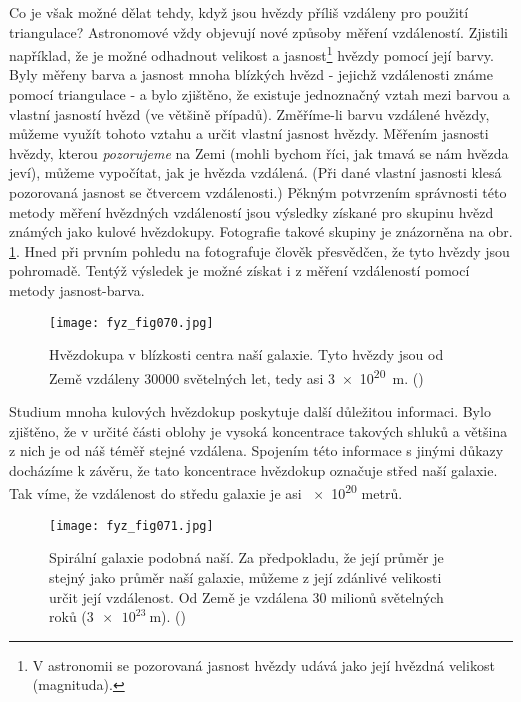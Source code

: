 {    Co je však možné dělat tehdy, když jsou hvězdy příliš vzdáleny pro použití triangulace? 
    Astronomové vždy objevují nové způsoby měření vzdáleností. Zjistili například, že je možné 
    odhadnout velikost a jasnost\footnote{V astronomii se pozorovaná jasnost hvězdy udává jako její 
    hvězdná velikost (magnituda).} hvězdy pomocí její barvy. Byly měřeny barva a jasnost mnoha 
    blízkých hvězd - jejichž vzdálenosti známe pomocí triangulace - a bylo zjištěno, že existuje 
    jednoznačný vztah mezi barvou a vlastní jasností hvězd (ve většině případů). Změříme-li barvu 
    vzdálené hvězdy, můžeme využít tohoto vztahu a určit vlastní jasnost hvězdy. Měřením jasnosti 
    hvězdy, kterou \emph{pozorujeme} na Zemi (mohli bychom říci, jak tmavá se nám hvězda jeví), 
    můžeme vypočítat, jak je hvězda vzdálená. (Při dané vlastní jasnosti klesá pozorovaná jasnost 
    se čtvercem vzdálenosti.) Pěkným potvrzením správnosti této metody měření hvězdných vzdáleností 
    jsou výsledky získané pro skupinu hvězd známých jako kulové hvězdokupy. Fotografie takové 
    skupiny je znázorněna na obr. \ref{fyz:fig070}. Hned při prvním pohledu na fotografuje člověk 
    přesvědčen, že tyto hvězdy jsou pohromadě. Tentýž výsledek je možné získat i z měření 
    vzdáleností pomocí metody jasnost-barva.

    \begin{figure}[ht!]  %
      \centering
      \texttt{[image: fyz\_fig070.jpg]}
      \caption{Hvězdokupa v blízkosti centra naší galaxie. Tyto hvězdy jsou od Země vzdáleny 
               \num{30000} světelných let, tedy asi \SI{3e20}{\m}. (\cite[s.~72]{Feynman01})}
      \label{fyz:fig070}
    \end{figure}
    
    Studium mnoha kulových hvězdokup poskytuje další důležitou informaci. Bylo zjištěno, že v 
    určité části oblohy je vysoká koncentrace takových shluků a většina z nich je od náš téměř 
    stejné vzdálena. Spojením této informace s jinými důkazy docházíme k závěru, že tato 
    koncentrace hvězdokup označuje střed naší galaxie. Tak víme, že vzdálenost do středu galaxie je 
    asi \num{e20} metrů. 
    

    \begin{figure}[ht!]  %
      \centering
      \texttt{[image: fyz\_fig071.jpg]}
      \caption{Spirální galaxie podobná naší. Za předpokladu, že její průměr je stejný jako průměr 
               naší galaxie, můžeme z její zdánlivé velikosti určit její vzdálenost. Od Země je 
               vzdálena \num{30} milionů světelných roků (\(\SI{3e23}{\m}\)). 
               (\cite[s.~72]{Feynman01})}
      \label{fyz:fig071}
    \end{figure}

}
